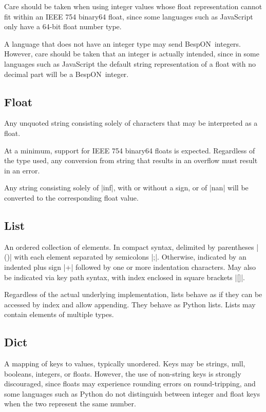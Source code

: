 \documentclass[11pt]{article}
\newcommand{\bespon}{BespON}
\begin{document}
Care should be taken when using integer values whose float representation cannot fit within an IEEE 754 binary64 float, since some languages such as JavaScript only have a 64-bit float number type.

A language that does not have an integer type may send \bespon\ integers.  However, care should be taken that an integer is actually intended, since in some languages such as JavaScript the default string representation of a float with no decimal part will be a \bespon\ integer.


\subsection{Float}

Any unquoted string consisting solely of characters that may be interpreted as a float.  

At a minimum, support for IEEE 754 binary64 floats is expected.  Regardless of the type used, any conversion from string that results in an overflow must result in an error.

Any string consisting solely of |inf|, with or without a sign, or of |nan| will be converted to the corresponding float value.


\subsection{List}

An ordered collection of elements.  In compact syntax, delimited by parentheses |()| with each element separated by semicolons |;|.  Otherwise, indicated by an indented plus sign |+| followed by one or more indentation characters.  May also be indicated via key path syntax, with index enclosed in square brackets |[]|.

Regardless of the actual underlying implementation, lists behave as if they can be accessed by index and allow appending.  They behave as Python lists.  Lists may contain elements of multiple types.


\subsection{Dict}

A mapping of keys to values, typically unordered.  Keys may be strings, null, booleans, integers, or floats.  However, the use of non-string keys is strongly discouraged, since floats may experience rounding errors on round-tripping, and some languages such as Python do not distinguish between integer and float keys when the two represent the same number.
\end{document}
